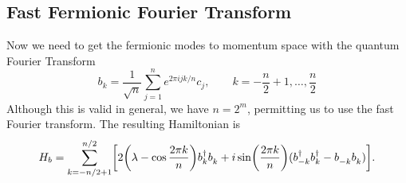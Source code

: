 \documentclass[12pt, twocolumn]{article}
\newcommand*{\eu}{e}
\newcommand*{\iu}{i}
\begin{document}
  \subsection{Fast Fermionic Fourier Transform}
  Now we need to get the fermionic modes to momentum space with the quantum Fourier Transform
  \begin{equation}
    \label{eq:qft}
    b_{k}
      = \frac{1}{\sqrt{n}}
        \sum_{j = 1}^{n} \eu^{2 \pi \iu j k / n} c_{j}, \qquad
    k = -\frac{n}{2} + 1, \dotsc, \frac{n}{2}
  \end{equation}
  Although this is valid in general, we have \( n = 2^{m} \), permitting us to use the fast Fourier transform. The resulting Hamiltonian is
  \begin{equation}
    H_{b}
      = \sum_{k = -n / 2 + 1}^{n / 2}
        \biggl[
          2 \biggl( \lambda - \cos \frac{2 \pi k}{n} \biggr)
          b_{k}^{\dagger} b_{k}^{\vphantom{\dagger}}
          + \iu \sin \biggl( \frac{2 \pi k}{n} \biggr)
            (b_{-k}^{\dagger} b_{k}^{\dagger}
             - b_{-k}^{\vphantom{\dagger}} b_{k}^{\vphantom{\dagger}})
        \biggr].
  \end{equation}
\end{document}
